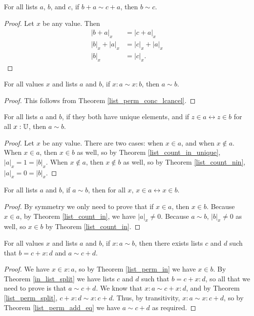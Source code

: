 \documentclass[../../math.tex]{subfiles}
\begin{document}
\begin{theorem} \label{list_perm_conc_rcancel}
    For all lists $a$, $b$, and $c$, if $b + a \sim c + a$, then $b \sim c$.
\end{theorem}
\begin{proof}
    Let $x$ be any value.  Then
    \begin{align*}
        |b + a|_x &= |c + a|_x \\
        |b|_x + |a|_x &= |c|_x + |a|_x \\
        |b|_x &= |c|_x.
    \end{align*}
\end{proof}

\begin{theorem} \label{list_perm_add_eq}
    For all values $x$ and lists $a$ and $b$, if $x : a \sim x : b$, then $a
    \sim b$.
\end{theorem}
\begin{proof}
    This follows from Theorem \ref{list_perm_conc_lcancel}.
\end{proof}

\begin{theorem} \label{list_in_unique_perm}
    For all lists $a$ and $b$, if they both have unique elements, and if $z \in
    a \leftrightarrow z \in b$ for all $x : \mathbb{U}$, then $a \sim b$.
\end{theorem}
\begin{proof}
    Let $x$ be any value.  There are two cases: when $x \in a$, and when $x
    \notin a$.  When $x \in a$, then $x \in b$ as well, so by Theorem
    \ref{list_count_in_unique}, $|a|_x = 1 = |b|_x$.  When $x \notin a$, then $x
    \notin b$ as well, so by Theorem \ref{list_count_nin}, $|a|_x = 0 = |b|_x$.
\end{proof}

\begin{theorem} \label{list_perm_in}
    For all lists $a$ and $b$, if $a \sim b$, then for all $x$, $x \in a
    \leftrightarrow x \in b$.
\end{theorem}
\begin{proof}
    By symmetry we only need to prove that if $x \in a$, then $x \in b$.
    Because $x \in a$, by Theorem \ref{list_count_in}, we have $|a|_x \neq 0$.
    Because $a \sim b$, $|b|_x \neq 0$ as well, so $x \in b$ by Theorem
    \ref{list_count_in}.
\end{proof}

\begin{theorem} \label{list_perm_split_eq}
    For all values $x$ and lists $a$ and $b$, if $x : a \sim b$, then there
    exists lists $c$ and $d$ such that $b = c + x : d$ and $a \sim c + d$.
\end{theorem}
\begin{proof}
    We have $x \in x : a$, so by Theorem \ref{list_perm_in} we have $x \in b$.
    By Theorem \ref{in_list_split} we have lists $c$ and $d$ such that $b = c +
    x : d$, so all that we need to prove is that $a \sim c + d$.  We know that
    $x : a \sim c + x : d$, and by Theorem \ref{list_perm_split}, $c + x : d
    \sim x : c + d$.  Thus, by transitivity, $x : a \sim x : c + d$, so by
    Theorem \ref{list_perm_add_eq} we have $a \sim c + d$ as required.
\end{proof}
\end{document}
